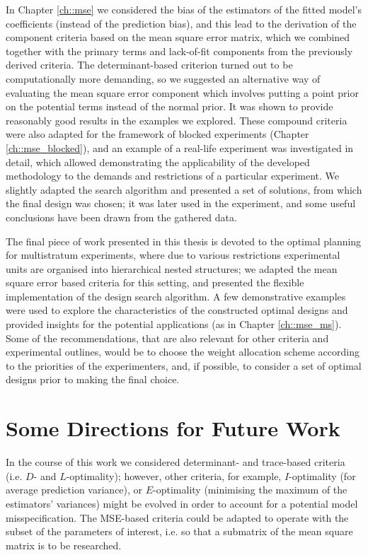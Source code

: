 In Chapter \ref{ch::mse} we considered the bias of the estimators of the fitted model's coefficients (instead of the prediction bias), and this lead to the derivation of the component criteria based on the mean square error matrix, which we combined together with the primary terms and lack-of-fit components from the previously derived criteria. The determinant-based criterion turned out to be computationally more demanding, so we suggested an alternative way of evaluating the mean square error component which involves putting a point prior on the potential terms instead of the normal prior. It was shown to provide reasonably good results in the examples we explored. These compound criteria were also adapted for the framework of blocked experiments (Chapter \ref{ch::mse_blocked}), and an example of a real-life experiment was investigated in detail, which allowed demonstrating the applicability of the developed methodology to the demands and restrictions of a particular experiment. We slightly adapted the search algorithm and presented a set of solutions, from which the final design was chosen; it was later used in the experiment, and some useful conclusions have been drawn from the gathered data.

The final piece of work presented in this thesis is devoted to the optimal planning for multistratum experiments, where due to various restrictions experimental units are organised into hierarchical nested structures; we adapted the mean square error based criteria for this setting, and presented the flexible implementation of the design search algorithm. A few demonstrative examples were used to explore the characteristics of the constructed optimal designs and provided insights for the potential applications (as in Chapter \ref{ch::mse_ms}). Some of the recommendations, that are also relevant for other criteria and experimental outlines, would be to choose the weight allocation scheme according to the priorities of the experimenters, and, if possible, to consider a set of optimal designs prior to making the final choice.

\section{Some Directions for Future Work}

In the course of this work we considered determinant- and trace-based criteria (i.e. $D$- and $L$-optimality); however, other criteria, for example, $I$-optimality (for average prediction variance), or $E$-optimality (minimising the maximum of the estimators' variances) might be evolved in order to account for a potential model misspecification. The MSE-based criteria could be adapted to operate with the subset of the parameters of interest, i.e. so that a submatrix of the mean square matrix is to be researched.

